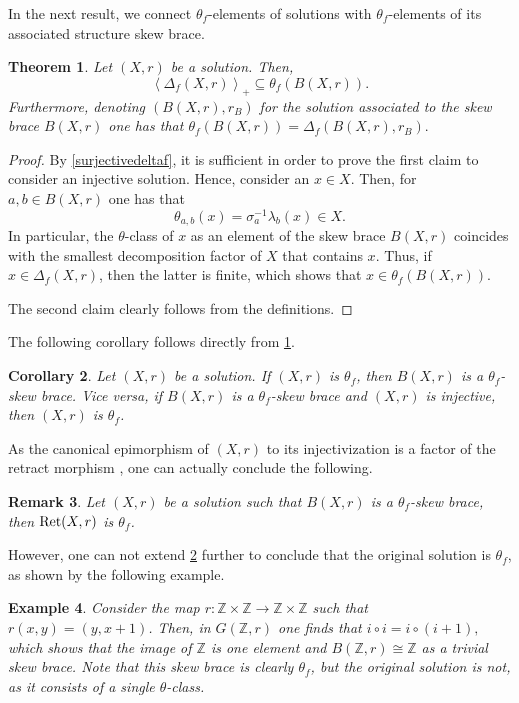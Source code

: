 \documentclass{amsart}
\newtheorem{thm}{Theorem}[section]
\newtheorem{cor}[thm]{Corollary}
\newtheorem{rem}[thm]{Remark}
\newtheorem{exa}[thm]{Example}
\begin{document}
In the next result, we connect $\theta_f$-elements of solutions with $\theta_f$-elements of its associated structure skew brace.

\begin{thm}\label{deltafinthetaf}
    Let $(X,r)$ be a solution. Then, $$ \left< \Delta_f(X,r)\right>_+ \subseteq \theta_f(B(X,r)). $$ Furthermore, denoting $(B(X,r),r_B)$ for the solution associated to the skew brace $B(X,r)$ one has that $\theta_f(B(X,r)) = \Delta_f(B(X,r),r_B).$
\end{thm}
\begin{proof}
    By \cref{surjectivedeltaf}, it is sufficient in order to prove the first claim to consider an injective solution. Hence, consider an $x \in X$. Then, for $a,b \in B(X,r)$ one has that $$\theta_{a,b}(x) = \sigma^{-1}_a\lambda_b(x) \in X.$$ In particular, the $\theta$-class of $x$ as an element of the skew brace $B(X,r)$ coincides with the smallest decomposition factor of $X$ that contains $x$. Thus, if $x \in \Delta_f(X,r)$, then the latter is finite, which shows that $x \in \theta_f(B(X,r))$.

    The second claim clearly follows from the definitions.
\end{proof}
The following corollary follows directly from \cref{deltafinthetaf}.
\begin{cor}\label{thetafsolisthetafskew}
    Let $ (X,r)$ be a solution. If $(X,r)$ is $\theta_f$, then $B(X,r)$ is a $\theta_f$-skew brace. Vice versa, if $B(X,r)$ is a $\theta_f$-skew brace and $(X,r)$ is injective, then $(X,r)$ is $\theta_f$.
\end{cor}
As the canonical epimorphism of $(X,r)$ to its injectivization is a factor of the retract morphism \cite{colazzo2023structure}, one can actually conclude the following.
\begin{rem}
    Let $(X,r)$ be a solution such that $B(X,r)$ is a $\theta_f$-skew brace, then $\textup{Ret}(X,r)$ is $\theta_f$.
\end{rem}
However, one can not extend \cref{thetafsolisthetafskew} further to conclude that the original solution is $\theta_f$, as shown by the following example.
\begin{exa}
    Consider the map $r\colon \mathbb{Z} \times \mathbb{Z} \rightarrow \mathbb{Z} \times \mathbb{Z}$ such that $r(x,y) = (y,x+1)$. Then, in $G(\mathbb{Z},r)$ one finds that $i \circ i = i \circ (i+1),$ which shows that the image of $\mathbb{Z}$ is one element and $B(\mathbb{Z},r) \cong \mathbb{Z}$ as a trivial skew brace. Note that this skew brace is clearly $\theta_f$, but the original solution is not, as it consists of a single $\theta$-class.
\end{exa}
\end{document}
